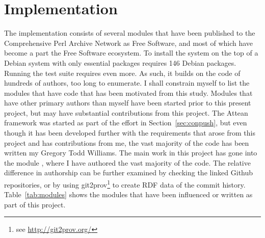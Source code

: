 \documentclass[a4paper, 12pt]{article}
\begin{document}
\section{Implementation}\label{sec:impl}

The implementation consists of several modules that have been
published to the Comprehensive Perl Archive Network as Free Software,
and most of which have become a part the Free Software ecosystem. To
install the system on the top of a Debian system with only essential
packages requires 146 Debian packages. Running the test suite requires
even more. As such, it builds on the code of hundreds of authors, too
long to enumerate. I shall constrain myself to list the modules that
have code that has been motivated from this study. Modules that have
other primary authors than myself have been started prior to this
present project, but may have substantial contributions from this
project. The Attean framework was started as part of the effort in
Section~\ref{sec:conpush}, but even though it has been developed
further with the requirements that arose from this project and has
contributions from me, the vast majority of the code has been written
my Gregory Todd Williams. The main work in this project has gone into
the module , where I have authored the vast
majority of the code. The relative difference in authorship can be
further examined by checking the linked Github repositories, or by
using git2prov\footnote{see \url{http://git2prov.org/}} to create RDF
data of the commit history. Table~\ref{tab:modules} shows the modules
that have been influenced or written as part of this project.
\end{document}
